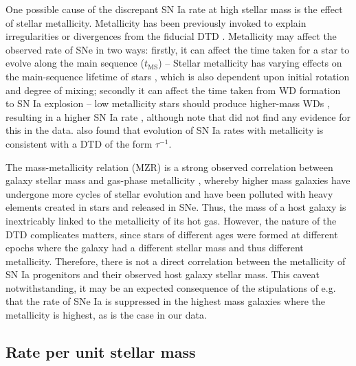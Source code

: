 \documentclass[fleqn,usenatbib]{mnras}
\begin{document}
One possible cause of the discrepant SN Ia rate at high stellar mass is the effect of stellar metallicity. Metallicity has been previously invoked to explain irregularities or divergences from the fiducial DTD \citep[e.g.][]{Strolger2010,Meng2011,Kistler2013}. Metallicity may affect the observed rate of SNe in two ways: firstly, it can affect the time taken for a star to evolve along the main sequence ($t_{\mathrm{MS}}$) -- Stellar metallicity has varying effects on the main-sequence lifetime of stars \citep[e.g.][]{Georgy2013,Amard2020}, which is also dependent upon initial rotation and degree of mixing; secondly it can affect the time taken from WD formation to SN Ia explosion -- low metallicity stars should produce higher-mass WDs \citep[e.g.][]{Umeda1999,Marigo2007}, resulting in a higher SN Ia rate \citep{Kistler2013}, although note that \citet{Kistler2013} did not find any evidence for this in the data. \citet{Graur2017a} also found that evolution of SN Ia rates with metallicity is consistent with a DTD of the form  $\tau^{-1}$.

The mass-metallicity relation (MZR) is a strong observed correlation between galaxy stellar mass and gas-phase metallicity \citep[e.g.][]{Tremonti2004}, whereby higher mass galaxies have undergone more cycles of stellar evolution and have been polluted with heavy elements created in stars and released in SNe. Thus, the mass of a host galaxy is inextricably linked to the metallicity of its hot gas. However, the nature of the DTD complicates matters, since stars of different ages were formed at different epochs where the galaxy had a different stellar mass and thus different metallicity. Therefore, there is not a direct correlation between the metallicity of SN Ia progenitors and their observed host galaxy stellar mass.  This caveat notwithstanding, it may be an expected consequence of the stipulations of e.g. \citet{Kistler2013} that the rate of SNe Ia is suppressed in the highest mass galaxies where the metallicity is highest, as is the case in our data.

\subsection{Rate per unit stellar mass \label{subsec:snum}}
\end{document}
